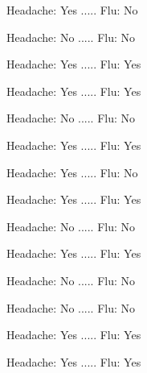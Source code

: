 \documentclass{article}\usepackage{graphicx, color}
\begin{document}
\begin{multicols}{3}
\noindent Headache: Yes .....      Flu: No

\bigskip
\bigskip

\noindent Headache: No .....      Flu: No

\bigskip
\bigskip

\noindent Headache: Yes .....      Flu: Yes

\bigskip
\bigskip

\noindent Headache: Yes .....      Flu: Yes

\bigskip
\bigskip

\noindent Headache: No .....      Flu: No

\bigskip
\bigskip

\noindent Headache: Yes .....      Flu: Yes

\bigskip
\bigskip

\noindent Headache: Yes .....      Flu: No

\bigskip
\bigskip

\noindent Headache: Yes .....      Flu: Yes

\bigskip
\bigskip

\noindent Headache: No .....      Flu: No

\bigskip
\bigskip

\noindent Headache: Yes .....      Flu: Yes

\bigskip
\bigskip

\noindent Headache: No .....      Flu: No

\bigskip
\bigskip

\noindent Headache: No .....      Flu: No

\bigskip
\bigskip

\noindent Headache: Yes .....      Flu: Yes

\bigskip
\bigskip

\noindent Headache: Yes .....      Flu: Yes

\bigskip
\bigskip





\end{multicols}
\end{document}
